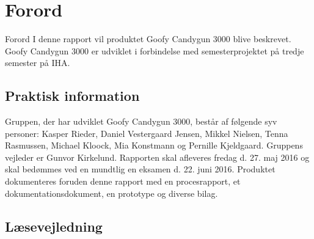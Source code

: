 \chapter{Forord}
Forord
I denne rapport vil produktet Goofy Candygun 3000 blive beskrevet. Goofy Candygun 3000 er udviklet i forbindelse med semesterprojektet på tredje semester på IHA.

\section{Praktisk information}
Gruppen, der har udviklet Goofy Candygun 3000, består af følgende syv personer: Kasper Rieder, Daniel Vestergaard Jensen, Mikkel Nielsen, Tenna Rasmussen, Michael Kloock, Mia Konstmann og Pernille Kjeldgaard. Gruppens vejleder er Gunvor Kirkelund. Rapporten skal afleveres fredag d. 27. maj 2016 og skal bedømmes ved en mundtlig en eksamen d. 22. juni 2016. Produktet dokumenteres foruden denne rapport med en procesrapport, et dokumentationsdokument, en prototype og diverse bilag. 

\section{Læsevejledning}
